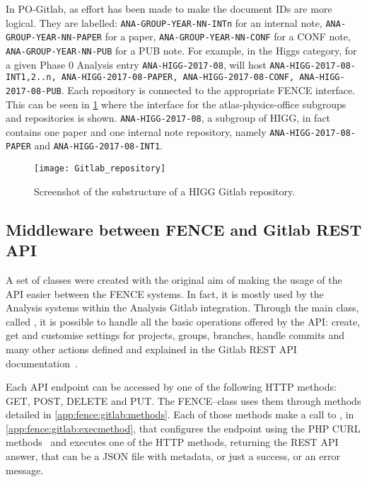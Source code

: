 In PO-Gitlab, as effort has been made to make the document IDs are more logical.
They are labelled: \texttt{ANA-GROUP-YEAR-NN-INTn} for an internal note,
\texttt{ANA-GROUP-YEAR-NN-PAPER} for a paper,
\texttt{ANA-GROUP-YEAR-NN-CONF} for a CONF note,
\texttt{ANA-GROUP-YEAR-NN-PUB} for a PUB note.
For example, in the Higgs category, for a given Phase 0 Analysis entry \texttt{ANA-HIGG-2017-08},
\pogitlab will host \texttt{ANA-HIGG-2017-08-INT1,2..n, ANA-HIGG-2017-08-PAPER, ANA-HIGG-2017-08-CONF, ANA-HIGG-2017-08-PUB}.
Each repository is connected to the appropriate FENCE interface.
This can be seen in \cref{fig:Gitlab_repository} where the \gitlab interface for the atlas-physics-office subgroups and repositories is shown.
\texttt{ANA-HIGG-2017-08}, a subgroup of HIGG, in fact contains one paper and one internal note repository, namely \texttt{ANA-HIGG-2017-08-PAPER} and \texttt{ANA-HIGG-2017-08-INT1}.

\begin{figure}[htb]
  \centering
  \texttt{[image: Gitlab\_repository]}
  \caption{Screenshot of the substructure of a HIGG Gitlab repository.
    }%
  \label{fig:Gitlab_repository}
\end{figure}

\subsection{Middleware between FENCE and Gitlab REST API}%
\label{sec:Middleware_between_FENCE_and_Gitlab_REST_API}

A set of classes were created with the original aim of making the usage of the \gitlab API easier between the FENCE systems.
In fact, it is mostly used by the Analysis systems within the Analysis Gitlab integration.
Through the main class, called , it is possible to handle all the basic operations offered by the API\@: create, get and customise settings for projects, groups, branches, handle commits and many other actions defined and explained in the Gitlab REST API documentation~\cite{rest_api}.

Each API endpoint can be accessed by one of the following HTTP methods: GET, POST, DELETE and PUT\@.
The FENCE--\gitlab class uses them through methods detailed in \cref{app:fence:gitlab:methods}.
Each of those methods make a call to , in \cref{app:fence:gitlab:execmethod},
that configures the endpoint using the PHP CURL methods~\cite{php_curl} and executes one of the HTTP methods, returning the REST API answer, that can be a JSON file with metadata, or just a success, or an error message.

